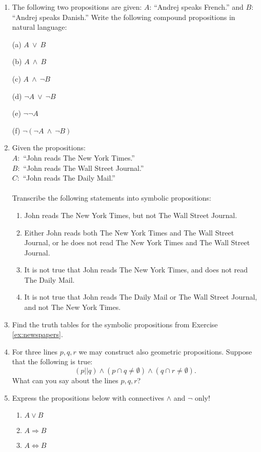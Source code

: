 \documentclass[11pt,paper=b5,footinclude,headinclude]{scrbook} %
\def\ali {{~\vee~}}
\def\inn {{~\wedge~}}
\theoremstyle{remark}
\theoremstyle{definition} %
\theoremstyle{theorem} %
\begin{document}
\begin{enumerate}[label=\textbf{Problem \arabic*.}]
\item
The following two propositions are given:
$A$: ``Andrej speaks French.'' and $B$: ``Andrej speaks Danish.''
Write the following compound propositions in natural language:

(a) $A\ali B$

(b) $A\inn B$

(c) $A\inn \neg B$

(d) $\neg A\ali \neg B$

(e) $\neg \neg A$

(f) $\neg (\neg A\inn \neg B)$


\item \label{ex:newspapers} Given the propositions:\\
$A:$ ``John reads The New York Times.''\\
$B:$ ``John reads The Wall Street Journal.''\\
$C:$ ``John reads The Daily Mail.''\\
\\
Transcribe the following statements into symbolic propositions:
\begin{enumerate}
\item John reads The New York Times, but not The Wall Street Journal.
\item Either John reads both The New York Times and The Wall Street Journal,
or he does not read The New York Times and The Wall Street Journal.
\item It is not true that John reads The New York Times, and does not read
The Daily Mail.
\item It is not true that John reads The Daily Mail or The Wall Street Journal,
and not The New York Times.
\end{enumerate}
\item Find the truth tables for the symbolic propositions from Exercise \ref{ex:newspapers}.


\item For three lines $p,q,r$ we may construct also geometric propositions.
Suppose that the following is true:
\[
(p||q)\wedge(p\cap q\neq\emptyset)\wedge(q\cap r\neq\emptyset).
\]
What can you say about the lines $p,q,r$?



\item Express the propositions below with connectives $\wedge$ and $\neg$
only!
\begin{enumerate}
\item $A\vee B$
\item $A\Rightarrow B$
\item $A\Leftrightarrow B$
\end{enumerate}

\end{enumerate}
\end{document}
